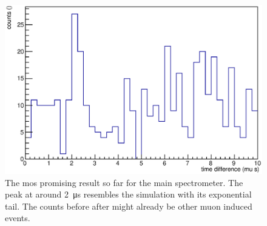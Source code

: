     \begin{figure}
	\centerline{\includegraphics[width = 1.\textwidth]{graphics/analysis/mainSpec/allInOne/1052_1055.eps}}
	\caption[Main spectrometer peak?]{The mos promising result so far for the main spectrometer. The peak at around \SI{2}{\micro\second} resembles the simulation with its exponential tail. The counts before after might already be other muon induced events.}
  	\label{fig:mainSpecProminentPeak}
  \end{figure}



  
  

